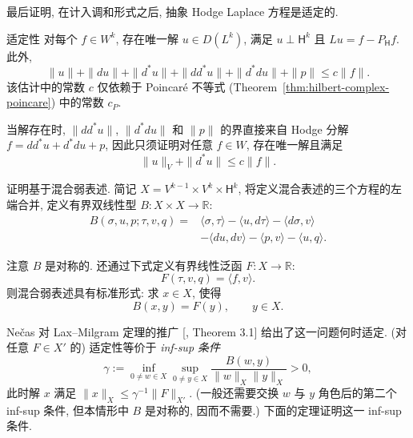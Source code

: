 最后证明, 在计入调和形式之后, 抽象 Hodge Laplace 方程是适定的.

\begin{Theorem}{{适定性}}\label{thm:hodge-well-posedness}
对每个 $f\in W^k$, 存在唯一解 $u\in D(L^k)$, 满足 $u\perp\mathsf H^k$ 且 $Lu=f-P_{\mathsf H}f$. 此外,
\[
\|u\|+\|du\|+\|d^*u\|+\|dd^*u\|+\|d^*du\|+\|p\|\leq c\|f\|.
\]
该估计中的常数 $c$ 仅依赖于 Poincaré 不等式 (Theorem~\ref{thm:hilbert-complex-poincare}) 中的常数 $c_P$.
\end{Theorem}

\begin{Proof}
当解存在时, $\|dd^*u\|$, $\|d^*du\|$ 和 $\|p\|$ 的界直接来自 Hodge 分解 $f=dd^*u+d^*du+p$, 因此只须证明对任意 $f\in W$, 存在唯一解且满足
\[
\|u\|_V+\|d^*u\|\leq c\|f\|.
\]

证明基于混合弱表述. 简记 $X=V^{k-1}\times V^k\times\mathsf H^k$, 将定义混合表述的三个方程的左端合并, 定义有界双线性型 $B:X\times X\to\mathbb R$:
\begin{equation}\label{eq:hodge-mixed-bilinear-form}
\begin{aligned}
B(\sigma,u,p;\tau,v,q)={}&\langle\sigma,\tau\rangle-\langle u,d\tau\rangle-\langle d\sigma,v\rangle\\
&-\langle du,dv\rangle-\langle p,v\rangle-\langle u,q\rangle.
\end{aligned}
\end{equation}

注意 $B$ 是对称的. 还通过下式定义有界线性泛函 $F:X\to\mathbb R$:
\begin{equation}\label{eq:hodge-mixed-load-functional}
F(\tau,v,q)=\langle f,v\rangle.
\end{equation}
则混合弱表述具有标准形式: 求 $x\in X$, 使得
\begin{equation}\label{eq:hodge-mixed-abstract-problem}
B(x,y)=F(y),\qquad y\in X.
\end{equation}

Nečas 对 Lax–Milgram 定理的推广 [, Theorem 3.1] 给出了这一问题何时适定. (对任意 $F\in X'$ 的) 适定性等价于 \emph{inf-sup 条件}
\begin{equation}\label{eq:hodge-inf-sup-condition}
\gamma:=\inf_{0\ne w\in X}\sup_{0\ne y\in X}\frac{B(w,y)}{\|w\|_X\|y\|_X}>0,
\end{equation}
此时解 $x$ 满足 $\|x\|_X\leq\gamma^{-1}\|F\|_{X'}$. (一般还需要交换 $w$ 与 $y$ 角色后的第二个 inf-sup 条件, 但本情形中 $B$ 是对称的, 因而不需要.) 下面的定理证明这一 inf-sup 条件.
\end{Proof}

